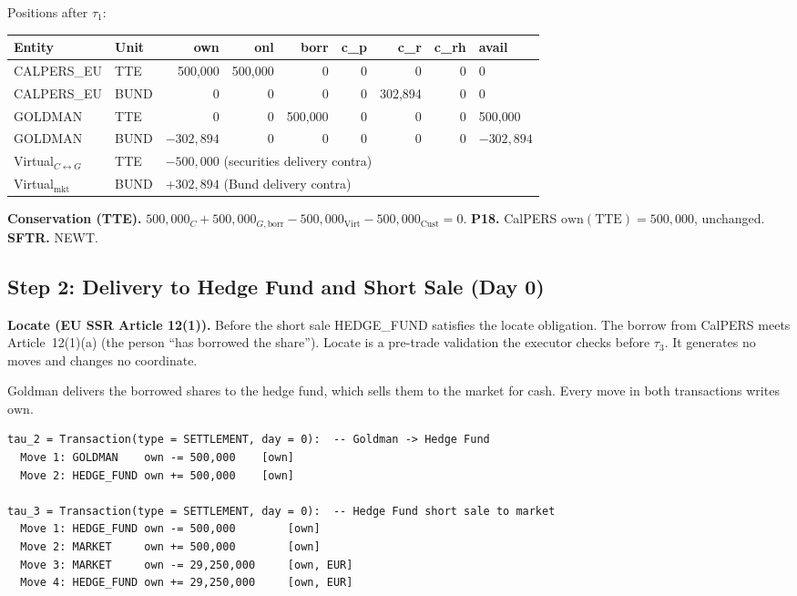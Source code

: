 Positions after $\tau_1$:

\begin{center}\small
\begin{tabular}{l l r r r r r r l}
\toprule
\textbf{Entity} & \textbf{Unit} & own & onl & borr & c\_p & c\_r & c\_rh & avail \\
\midrule
CALPERS\_EU & TTE & 500{,}000 & 500{,}000 & 0 & 0 & 0 & 0 & 0 \\
CALPERS\_EU & BUND & 0 & 0 & 0 & 0 & 302{,}894 & 0 & 0 \\
GOLDMAN & TTE & 0 & 0 & 500{,}000 & 0 & 0 & 0 & 500{,}000 \\
GOLDMAN & BUND & $-302{,}894$ & 0 & 0 & 0 & 0 & 0 & $-302{,}894$ \\
Virtual$_{C{\leftrightarrow}G}$ & TTE & \multicolumn{7}{l}{$-500{,}000$ (securities delivery contra)} \\
Virtual$_{\mathrm{mkt}}$ & BUND & \multicolumn{7}{l}{$+302{,}894$ (Bund delivery contra)} \\
\bottomrule
\end{tabular}
\end{center}

\noindent\textbf{Conservation (TTE).} $500{,}000_C + 500{,}000_{G,\mathrm{borr}} - 500{,}000_{\mathrm{Virt}} - 500{,}000_{\mathrm{Cust}} = 0$. \checkmark\quad
\textbf{P18.} CalPERS $\mathrm{own}(\text{TTE}) = 500{,}000$, unchanged. \checkmark\quad
\textbf{SFTR.} NEWT.

\subsection{Step 2: Delivery to Hedge Fund and Short Sale (Day 0)}
\label{sec:eu-step2}

\textbf{Locate (EU SSR Article 12(1)).} Before the short sale HEDGE\_FUND satisfies the locate obligation. The borrow from CalPERS meets Article~12(1)(a) (the person ``has borrowed the share''). Locate is a pre-trade validation the executor checks before $\tau_3$. It generates no moves and changes no coordinate.

Goldman delivers the borrowed shares to the hedge fund, which sells them to the market for cash. Every move in both transactions writes $\mathrm{own}$.

\begin{lstlisting}
tau_2 = Transaction(type = SETTLEMENT, day = 0):  -- Goldman -> Hedge Fund
  Move 1: GOLDMAN    own -= 500,000    [own]
  Move 2: HEDGE_FUND own += 500,000    [own]

tau_3 = Transaction(type = SETTLEMENT, day = 0):  -- Hedge Fund short sale to market
  Move 1: HEDGE_FUND own -= 500,000        [own]
  Move 2: MARKET     own += 500,000        [own]
  Move 3: MARKET     own -= 29,250,000     [own, EUR]
  Move 4: HEDGE_FUND own += 29,250,000     [own, EUR]
\end{lstlisting}

